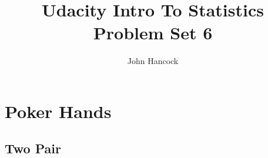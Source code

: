 \documentclass[a4paper,11pt]{article}
\author{John Hancock}
\title{Udacity Intro To Statistics Problem Set 6}
\begin{document}
\maketitle
\tableofcontents

\section{Poker Hands}
\subsection{Two Pair}
\end{document}
